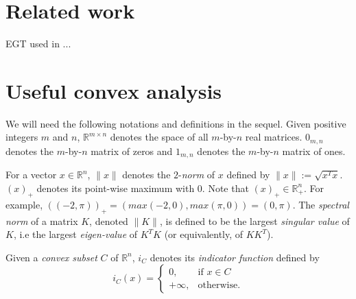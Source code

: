 \documentclass{article} %
\begin{document}



\section{Related work}
\label{sec:related_work}
EGT used in \cite{hoda2010smoothing}...

\section{Useful convex analysis}
\label{sec:notation}
We will need the following notations and definitions in the sequel. Given positive integers $m$ and $n$, $\mathbb{R}^{m \times n}$ denotes
the space of all $m$-by-$n$ real matrices. $0_{m,n}$ denotes the $m$-by-$n$ matrix of zeros and $1_{m,n}$ denotes the $m$-by-$n$ matrix of ones.

For a vector $x \in \mathbb{R}^n$, $\|x\|$ denotes the $2$-\textit{norm} of $x$ defined by $\|x\| := \sqrt{x^Tx}$.
$(x)_+$ denotes its point-wise maximum with 0. Note that $(x)_+ \in \mathbb{R}^n_+$.
For example, $((-2, \pi))_+ = (max(-2, 0), max(\pi, 0)) = (0, \pi)$. The \textit{spectral norm} of a matrix $K$,
denoted $\|K\|$, is defined to be the largest \textit{singular value} of $K$, i.e the largest \textit{eigen-value} of $K^TK$ (or equivalently, of $KK^T$).

Given a \textit{convex subset} $C$ of $\mathbb{R}^n$, $i_C$ denotes its \textit{indicator function} defined by
\begin{equation}
  i_C(x) = \begin{cases}
    0, &\mbox{if } x \in C\\
    +\infty, &\mbox{otherwise}.
    \end{cases}
  \end{equation}
\end{document}
